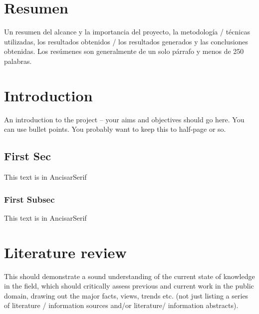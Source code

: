 \documentclass[12pt, letterpaper]{memoir}
\begin{document}
\clearpage


\chapter*{Resumen}
Un resumen del alcance y la importancia del proyecto, la metodología / técnicas utilizadas, los resultados obtenidos / los resultados generados y las conclusiones obtenidas. Los resúmenes son generalmente de un solo párrafo y menos de 250 palabras.
\clearpage

\tableofcontents*
\newpage{}



\singlespacing


\chapter{Introduction}
An introduction to the project -- your aims and objectives should go here. You can use bullet points. You probably want to keep this to half-page or so.

\section{First Sec}

{\UNAncizarSerif This text is in AncisarSerif}

\subsection{First Subsec}

{\UNAncizarSerif This text is in AncisarSerif}

\chapter{Literature review}
This should demonstrate a sound understanding of the current state of knowledge in the field, which should critically assess previous and current work in the public domain, drawing out the major facts, views, trends etc. (not just listing a series of literature / information sources and/or literature/ information abstracts). 
\end{document}
